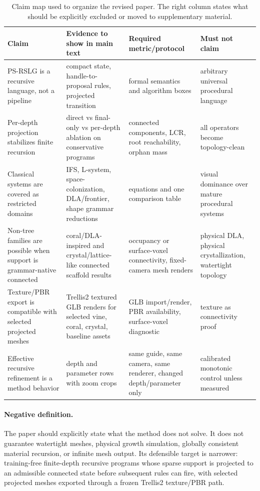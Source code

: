 \begin{table}[t]
  \centering
  \caption{Claim map used to organize the revised paper. The right column
  states what should be explicitly excluded or moved to supplementary material.}
  \label{tab:reviewer-claim-map}
  \begin{tabular}{@{}p{}p{}p{}p{}@{}}
    \toprule
    Claim & Evidence to show in main text & Required metric/protocol & Must not claim \\
    \midrule
    PS-RSLG is a recursive language, not a pipeline &
    compact state, handle-to-proposal rules, projected transition &
    formal semantics and algorithm boxes &
    arbitrary universal procedural language \\
    Per-depth projection stabilizes finite recursion &
    direct vs final-only vs per-depth ablation on conservative programs &
    connected components, LCR, root reachability, orphan mass &
    all operators become topology-clean \\
    Classical systems are covered as restricted domains &
    IFS, L-system, space-colonization, DLA/frontier, shape grammar reductions &
    equations and one comparison table &
    visual dominance over mature procedural systems \\
    Non-tree families are possible when support is grammar-native connected &
    coral/DLA-inspired and crystal/lattice-like connected scaffold results &
    occupancy or surface-voxel connectivity, fixed-camera mesh renders &
    physical DLA, physical crystallization, watertight topology \\
    Texture/PBR export is compatible with selected projected meshes &
    Trellis2 textured GLB renders for selected vine, coral, crystal, baseline assets &
    GLB import/render, PBR availability, surface-voxel diagnostic &
    texture as connectivity proof \\
    Effective recursive refinement is a method behavior &
    depth and parameter rows with zoom crops &
    same guide, same camera, same renderer, changed depth/parameter only &
    calibrated monotonic control unless measured \\
    \bottomrule
  \end{tabular}
\end{table}

\paragraph{Negative definition.}
The paper should explicitly state what the method does not solve. It does not
guarantee watertight meshes, physical growth simulation, globally consistent
material recursion, or infinite mesh output. Its defensible target is narrower:
training-free finite-depth recursive programs whose sparse support is projected
to an admissible connected state before subsequent rules can fire, with
selected projected meshes exported through a frozen Trellis2 texture/PBR path.

